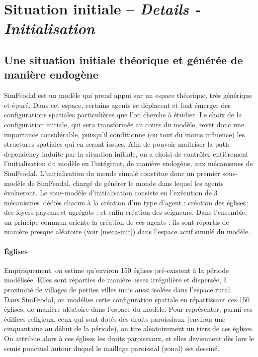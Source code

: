 \section[Situation initiale -- \textit{Details - Initialisation}]{Situation initiale -- \large{\textit{Details - Initialisation}}\label{sec:initialisation}}
\let\sectionmark\orisectionmark

\setcounter{savefootnote}{\value{footnote}}

\subsection{Une situation initiale théorique et générée de manière endogène}

SimFeodal est un modèle qui prend appui sur un espace théorique, très générique et épuré.
Dans cet espace, certains agents se déplacent et font émerger des configurations spatiales particulières que l'on cherche à étudier.
Le choix de la configuration initiale, qui sera transformée au cours du modèle, 
revêt donc une importance considérable, puisqu'il conditionne (ou tout du moins influence) les structures spatiales qui en seront issues.
Afin de pouvoir maitriser la \og path-dependency\fg{} induite par la situation initiale, on a choisi de contrôler entièrement l'initialisation du modèle en l'intégrant, de manière endogène, aux mécanismes de SimFeodal.
L'initialisation du monde simulé constitue donc un premier \og sous-modèle\fg{} de SimFeodal, chargé de générer le monde dans lequel les agents évolueront.
Le sous-modèle d'initialisation consiste en l'exécution de 3 mécanismes dédiés chacun à la création d'un type d'agent : création des églises ; des foyers paysans et agrégats ; et enfin création des seigneurs.
Dans l'ensemble, un principe commun oriente la création de ces agents : ils sont répartis de manière presque aléatoire (voir \cref{meca-init}) dans l'espace \og actif\fg{} simulé du modèle.

\paragraph{Églises}
Empiriquement, on estime qu'environ 150 églises pré-existent à la période modélisée.
Elles sont réparties de manière assez irrégulière et dispersée, à proximité de villages de petites villes mais aussi isolées dans l'espace rural.\\
Dans SimFeodal, on modélise cette configuration spatiale en répartissant ces 150\unskip{} églises, de manière aléatoire dans l'espace du modèle.
Pour représenter, parmi ces édifices religieux, ceux qui sont dotés des droits paroissiaux (environ une cinquantaine au début de la période), on tire aléatoirement un tiers de ces églises.
On attribue alors à ces églises les droits paroissiaux, et elles deviennent dès lors le semis ponctuel autour duquel le maillage paroissial (zonal) est dessiné.


